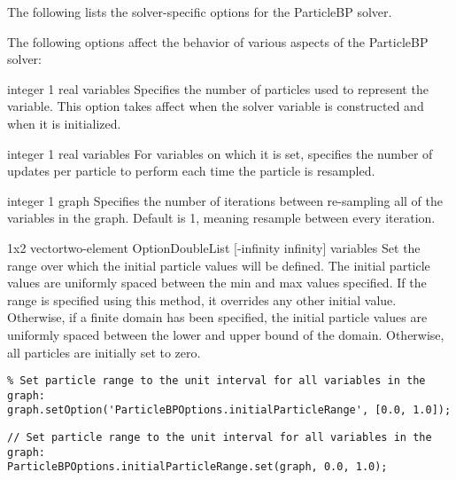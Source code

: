 The following lists the solver-specific options for the ParticleBP solver.


The following options affect the behavior of various aspects of the ParticleBP solver:


{integer}
{1}
{real variables}
{Specifies the number of particles used to represent the variable. This option takes affect when the solver variable is constructed and when it is initialized.}


{integer}
{1}
{real variables}
{For variables on which it is set, specifies the number of updates per particle to perform each time the particle is resampled.}


{integer}
{1}
{graph}
{Specifies the number of iterations between re-sampling all of the variables in the graph. Default is 1, meaning resample between every iteration.}


{\ifmatlab 1x2 vector\fi \ifjava two-element OptionDoubleList\fi}
{[-infinity infinity]}
{variables}
{Set the range over which the initial particle values will be defined. The initial particle values are uniformly spaced between the min and max values specified. If the range is specified using this method, it overrides any other initial value. Otherwise, if a finite domain has been specified, the initial particle values are uniformly spaced between the lower and upper bound of the domain. Otherwise, all particles are initially set to zero.}

\ifmatlab
\begin{lstlisting}
% Set particle range to the unit interval for all variables in the graph:
graph.setOption('ParticleBPOptions.initialParticleRange', [0.0, 1.0]);
\end{lstlisting}
\fi
\ifjava
\begin{lstlisting}
// Set particle range to the unit interval for all variables in the graph:
ParticleBPOptions.initialParticleRange.set(graph, 0.0, 1.0);
\end{lstlisting}
\fi

